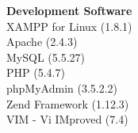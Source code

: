 \documentclass[12pt]{article}
\begin{document}
\begin{appendices}
\begin{spacing}{1.0}
\noindent\textbf{Development Software} \\
XAMPP for Linux (1.8.1) \\
Apache (2.4.3) \\
MySQL (5.5.27) \\
PHP (5.4.7) \\
phpMyAdmin (3.5.2.2) \\
Zend Framework (1.12.3) \\
VIM - Vi IMproved (7.4)
\end{spacing}


\end{appendices}
\end{document}
